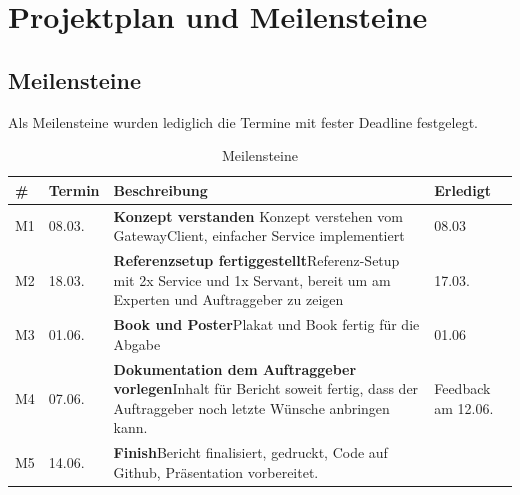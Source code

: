 \section{Projektplan und Meilensteine}
\subsection{Meilensteine}
Als Meilensteine wurden lediglich die Termine mit fester Deadline festgelegt.
\begin{table}[H]
	\centering
	\begin{tabular}{llp{11cm}p{2cm}} \toprule
		\textbf{\#} 			& \textbf{Termin}	& \textbf{Beschreibung}	& \textbf{Erledigt}	\\ \midrule
		M1 & 08.03. & \textbf{Konzept verstanden} \newline Konzept verstehen vom GatewayClient, einfacher Service implementiert	& 08.03\\ \midrule
		M2 & 18.03. & \textbf{Referenzsetup fertiggestellt}\newline  Referenz-Setup mit 2x Service und 1x Servant, bereit um am Experten und Auftraggeber zu zeigen & 17.03.	\\ \midrule
		M3 & 01.06. & \textbf{Book und Poster}\newline  Plakat und Book fertig für die Abgabe & 01.06	\\ \midrule				
		M4 & 07.06. & \textbf{Dokumentation dem Auftraggeber vorlegen}\newline  Inhalt für Bericht soweit fertig, dass der Auftraggeber noch letzte Wünsche anbringen kann.& Feedback am 12.06.	\\ \midrule
		M5 & 14.06. & \textbf{Finish}\newline Bericht finalisiert, gedruckt, Code auf Github, Präsentation vorbereitet.	\\ \bottomrule
	\end{tabular}
	\caption{Meilensteine}
	\label{tab:meilensteine}
\end{table}

